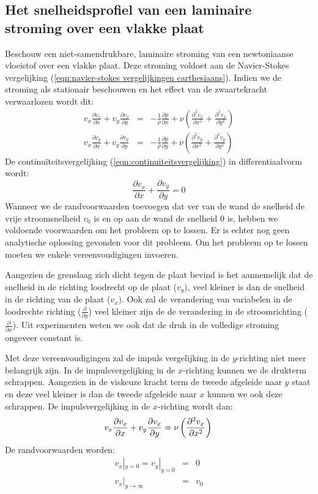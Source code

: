 		\subsection{Het snelheidsprofiel van een laminaire stroming over een vlakke plaat}
Beschouw een niet-samendrukbare, laminaire stroming van een newtoniaanse vloeistof over een vlakke plaat. Deze stroming voldoet aan de Navier-Stokes vergelijking (\ref{eqn:navier-stokes vergelijkingen carthesiaans}). Indien we de stroming als stationair beschouwen en het effect van de zwaartekracht verwaarlozen wordt dit:
\begin{eqnarray}
	v_x \frac{\partial v_x}{\partial x} + v_y \frac{\partial v_x}{\partial y} &=& -\frac{1}{\rho}\frac{\partial p}{\partial x} + \nu \left( \frac{\partial^2 v_x}{\partial x^2} + \frac{\partial^2 v_x}{\partial y^2} \right) \\
	v_x \frac{\partial v_y}{\partial x} + v_y \frac{\partial v_y}{\partial y} &=& -\frac{1}{\rho}\frac{\partial p}{\partial y} + \nu \left( \frac{\partial^2 v_y}{\partial x^2} + \frac{\partial^2 v_y}{\partial y^2} \right)
\end{eqnarray}
De continuïteitsvergelijking (\ref{eqn:continuiteitsvergelijking}) in differentiaalvorm wordt:
\begin{equation}
	\frac{\partial v_x}{\partial x} + \frac{\partial v_y}{\partial y} = 0
\end{equation}
Wanneer we de randvoorwaarden toevoegen dat ver van de wand de snelheid de vrije stroomsnelheid $v_0$ is en op aan de wand de snelheid 0 is, hebben we voldoende voorwaarden om het probleem op te lossen. Er is echter nog geen analytische oplossing gevonden voor dit probleem. Om het probleem op te lossen moeten we enkele vereenvoudigingen invoeren. 

Aangezien de grenslaag zich dicht tegen de plaat bevind is het aannemelijk dat de snelheid in de richting loodrecht op de plaat ($v_y$), veel kleiner is dan de snelheid in de richting van de plaat ($v_x$). Ook zal de verandering van variabelen in de loodrechte richting ($\frac{\partial}{\partial y}$) veel kleiner zijn de de verandering in de stroomrichting ($\frac{\partial}{\partial x}$). Uit experimenten weten we ook dat de druk in de volledige stroming ongeveer constant is. 

Met deze vereenvoudigingen zal de impuls vergelijking in de $y$-richting niet meer belangrijk zijn. In de impulsvergelijking in de $x$-richting kunnen we de drukterm schrappen. Aangezien in de viskeuze kracht term de tweede afgeleide naar $y$ staat en deze veel kleiner is dan de tweede afgeleide naar $x$ kunnen we ook deze schrappen. De impulsvergelijking in de $x$-richting wordt dan:
\begin{equation}
	v_x \frac{\partial v_x}{\partial x} + v_y \frac{\partial v_x}{\partial y} = \nu \left( \frac{\partial^2 v_x}{\partial x^2} \right) \\
\end{equation}
De randvoorwaarden worden:
\begin{eqnarray}
	v_x|_{y=0} = v_y|_{y=0} &=& 0 \\
	v_x|_{y\rightarrow\infty} &=& v_0
\end{eqnarray}


